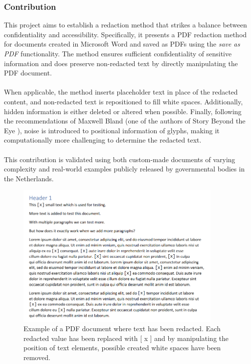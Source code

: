 \subsubsection{Contribution}
This project aims to establish a redaction method that strikes a balance between confidentiality and accessibility. Specifically, it presents a PDF redaction method for documents created in Microsoft Word and saved as PDFs using the \textit{save as PDF} functionality. The method ensures sufficient confidentiality of sensitive information and does preserve non-redacted text by directly manipulating the PDF document. 
\\\\
When applicable, the method inserts placeholder text in place of the redacted content, and non-redacted text is repositioned to fill white spaces. Additionally, hidden information is either deleted or altered when possible. Finally, following the recommendations of Maxwell Bland (one of the authors of Story Beyond the Eye \cite{bland2022story}), noise is introduced to positional information of glyphs, making it computationally more challenging to determine the redacted text.
\\\\
This contribution is validated using both custom-made documents of varying complexity and real-world examples publicly released by governmental bodies in the Netherlands.

\begin{figure}[h]
\includegraphics[width=0.9\textwidth]{latex/media/before.png}
\centering
\caption{Example of a PDF document where text has been redacted. Each redacted value has been replaced with [ x ] and by manipulating the position of text elements, possible created white spaces have been removed.}
\label{fig:redactionExamples}
\end{figure}



